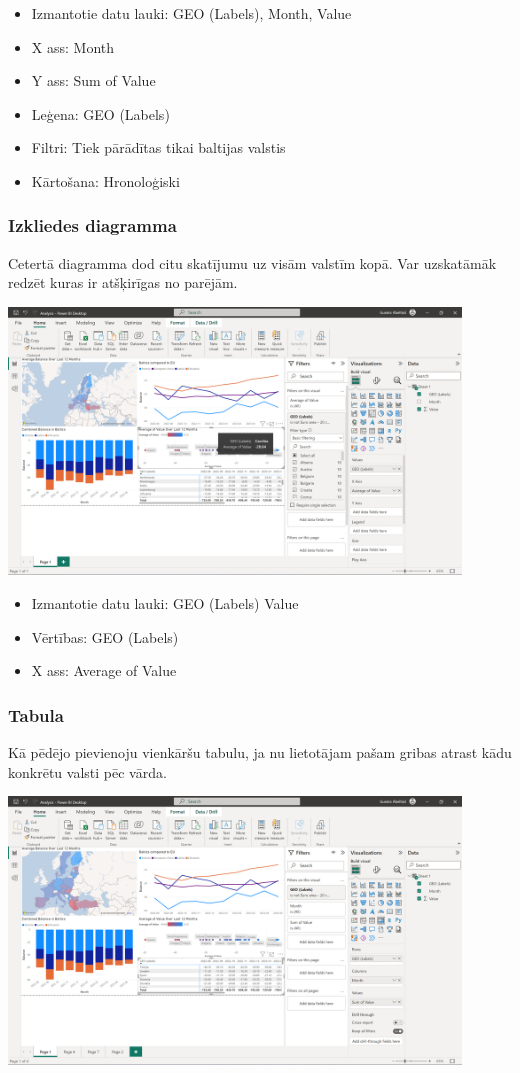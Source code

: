 \documentclass{article}
\begin{document}
\begin{itemize}
    \item Izmantotie datu lauki: GEO (Labels), Month, Value
    \item X ass: Month
    \item Y ass: Sum of Value
    \item Leģena: GEO (Labels)
    \item Filtri: Tiek pārādītas tikai baltijas valstis
    \item Kārtošana: Hronoloģiski
\end{itemize}


\subsubsection{Izkliedes diagramma}
Cetertā diagramma dod citu skatījumu uz visām valstīm kopā. Var uzskatāmāk redzēt kuras ir atšķirīgas no parējām.

\includegraphics[width=0.9\textwidth, center]{Scatter}

\begin{itemize}
    \item Izmantotie datu lauki: GEO (Labels) Value
    \item Vērtības: GEO (Labels)
    \item X ass: Average of Value
\end{itemize}

\subsubsection{Tabula}
Kā pēdējo pievienoju vienkāršu tabulu, ja nu lietotājam pašam gribas atrast kādu konkrētu valsti pēc vārda.

\includegraphics[width=0.9\textwidth, center]{Matrix}
\end{document}
